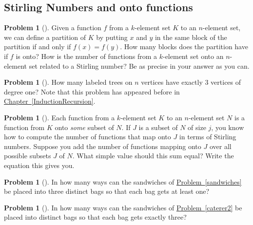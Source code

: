 \documentclass[10pt,]{book}
\theoremstyle{plain}
\theoremstyle{definition}
\newtheorem{activity}[project]{Problem}
\theoremstyle{definition}
\numberwithin{equation}{chapter}
\newcommand{\importantarrow}{\Rightarrow}
\begin{document}
\subsection[{Stirling Numbers and onto functions}]{Stirling Numbers and onto functions}\label{subsection-34}
\begin{activity}[] \label{activity-143}
Given a function \(f\) from a \(k\)-element set \(K\) to an \(n\)-element set, we can define a partition of \(K\) by putting \(x\) and \(y\) in the same block of the partition if and only if \(f(x)=f(y)\). How many blocks does the partition have if \(f\) is onto? How is the number of functions from a \(k\)-element set onto an \(n\)-element set related to a Stirling number? Be as precise in your answer as you can.%
\end{activity}
\begin{activity}[]\marginsymbol[-1em]{\pdftooltip{$\importantarrow$}{especially interesting}} \label{activity-144}
How many labeled trees on \(n\) vertices have exactly 3 vertices of degree one?  Note that this problem has appeared before in \hyperref[InductionRecursion]{Chapter~\ref{InductionRecursion}}.%
\end{activity}
\begin{activity}[] \label{Stirlingfalling}
Each function from a \(k\)-element set \(K\) to an \(n\)-element set \(N\) is a function from \(K\) onto \emph{some} subset of \(N\). If \(J\) is a subset of \(N\) of size \(j\), you know how to compute the number of functions that map onto \(J\) in terms of Stirling numbers. Suppose you add the number of functions mapping onto \(J\) over all possible subsets \(J\) of \(N\). What simple value should this sum equal? Write the equation this gives you.%
\end{activity}
\begin{activity}[] \label{activity-146}
In how many ways can the sandwiches of \hyperref[sandwiches]{Problem~\ref{sandwiches}} be placed into three distinct bags so that each bag gets at least one?%
\end{activity}
\begin{activity}[] \label{activity-147}
In how many ways can the sandwiches of \hyperref[caterer2]{Problem~\ref{caterer2}} be placed into distinct bags so that each bag gets exactly three?%
\end{activity}
\end{document}
